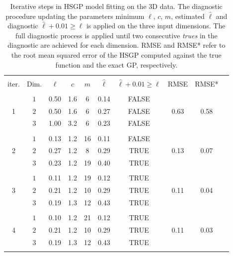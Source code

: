 \begin{table}
\centering
\setlength{\tabcolsep}{3.6pt}
\begin{tabular}{cccccccccc}
\arrayrulecolor{gray}\hline \\[-3mm]
 iter. & Dim. & $\ell$ & $c$ & $m$ & $\hat{\ell}$ & $\hat{\ell} + 0.01 \geq \ell$ & RMSE & RMSE* \\ 
\arrayrulecolor{lightgray}\hline \\[-2mm]
 \multirow{3}{*}{ 1 } & $1$ & 0.50 & 1.6 & 6 & 0.14 & FALSE & \multirow{3}{*}{ 0.63 } & \multirow{3}{*}{ 0.58 }\\ 
 & $2$ & 0.50 & 1.6 & 6 & 0.27 & FALSE &  &  \\
 & $3$ & 1.00 & 3.2 & 6 & 0.23 & FALSE &  &  \\
\arrayrulecolor{lightgray}\hline \\[-2mm]
 \multirow{3}{*}{ 2 } & $1$ & 0.13 & 1.2 & 16 & 0.11 & FALSE  & \multirow{3}{*}{ 0.13 } & \multirow{3}{*}{ 0.07 }\\
 & $2$ & 0.27 & 1.2 & 8 & 0.29 & TRUE &  &  \\
 & $3$ & 0.23 & 1.2 & 19 & 0.40 & TRUE &  &  \\
\arrayrulecolor{lightgray}\hline \\[-2mm]
 \multirow{3}{*}{ 3 } & $1$ & 0.11 & 1.2 & 19 & 0.12 & TRUE  & \multirow{3}{*}{ 0.11 } & \multirow{3}{*}{ 0.04 }\\
 & $2$ & 0.21 & 1.2 & 10 & 0.29 & TRUE &  &  \\
 & $3$ & 0.19 & 1.3 & 12 & 0.43 & TRUE &  &  \\
 \arrayrulecolor{lightgray}\hline \\[-2mm]
 \multirow{3}{*}{ 4 } & $1$ & 0.10 & 1.2 & 21 & 0.12 & TRUE  & \multirow{3}{*}{ 0.11 } & \multirow{3}{*}{ 0.03 }\\
 & $2$ & 0.21 & 1.2 & 10 & 0.29 & TRUE &  &  \\
 & $3$ & 0.19 & 1.3 & 12 & 0.43 & TRUE &  &  \\[1mm] 
\arrayrulecolor{lightgray}\hline
 \multicolumn{9}{l}{{\small Exact GP length-scales:} $\ell_{1_{GP}}=0.11$, \,$\ell_{2_{GP}}=0.32$, \, $\ell_{3_{GP}}=0.43$ }
\end{tabular}
\caption{Iterative steps in HSGP model fitting on the $3$D data. The diagnostic procedure updating the parameters minimum $\ell$, $c$, $m$, estimated $\hat{\ell}$ and diagnostic $\hat{\ell} + 0.01 \geq \ell$ is applied on the three input dimensions. The full diagnostic process is applied until two consecutive \textit{trues} in the diagnostic are achieved for each dimension. RMSE and RMSE* refer to the root mean squared error of the HSGP computed against the true function and the exact GP, respectively.}
  \label{tab_caseIII_3D}
\end{table}

